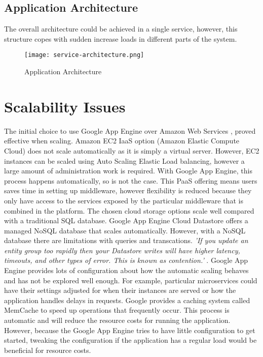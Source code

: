 \documentclass[conference]{IEEEtran}
\begin{document}
\subsection{Application Architecture}

The overall architecture could be achieved in a single service, however, this structure copes with sudden increase loads in different parts of the system.

\begin{figure}[ht] %
    \centering
    \texttt{[image: service-architecture.png]}
    \caption{Application Architecture}
    \label{fig:sa}
\end{figure}



\section{Scalability Issues}

The initial choice to use Google App Engine over Amazon Web Services \cite{aws:about}, proved effective when scaling. Amazon EC2 IaaS option (Amazon Elastic Compute Cloud) \cite{aws:ec2} does not scale automatically as it is simply a virtual server. However, EC2 instances can be scaled using Auto Scaling Elastic Load balancing, however a large amount of administration work is required. With Google App Engine, this process happens automatically, so is not the case. This PaaS offering means users saves time in setting up middleware, however flexibility is reduced because they only have access to the services exposed by the particular middleware that is combined in the platform.\newline
\newline
The chosen cloud storage options scale well compared with a traditional SQL database. Google App Engine Cloud Datastore offers a managed NoSQL database that scales automatically. However, with a NoSQL database there are limitations with queries and transcations. \emph{'If you update an entity group too rapidly then your Datastore writes will have higher latency, timeouts, and other types of error. This is known as contention.'} \cite{gae:scalability}.\newline
\newline
Google App Engine provides lots of configuration about how the automatic scaling behaves and has not be explored well enough. For example, particular microservices could have their settings adjusted for when their instances are served or how the application handles delays in requests.\newline
\newline
Google provides a caching system called MemCache to speed up operations that frequently occur. This process is automatic and will reduce the resource costs for running the application. However, because the Google App Engine tries to have little configuration to get started, tweaking the configuration if the application has a regular load would be beneficial for resource costs.
\end{document}
